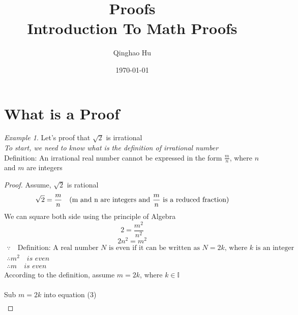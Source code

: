 \documentclass[12pt]{article}
\title{\textbf{Proofs} \\ \large Introduction To Math Proofs}
\author{Qinghao Hu}
\date{\today}
\theoremstyle{remark}
\newtheorem*{example}{Example}
\begin{document}
\maketitle
\newpage
\tableofcontents
\newpage

\section{What is a Proof}
\begin{example}
	Let's proof that $\sqrt{2}$ is irrational\\
	\indent\textit{To start, we need to know what is the definition of irrational number} \\
	\indent Definition: An irrational real number cannot be expressed in the form $\frac{m}{n}$, where $n$ and $m$ are integers \\
	\begin{proof}
		Assume, $\sqrt{2}$ is rational \\
		\begin{equation}
			\sqrt{2} = {m \over n} \quad \text{(m and n are integers and $\frac{m}{n}$ is a reduced fraction)}
		\end{equation}
		We can square both side using the principle of Algebra \\
		\begin{equation}
			2 = \frac{m^2}{n^2} 
		\end{equation}
		\begin{equation}
			2n^2 = m^2
		\end{equation}
		\begin{gather}
		\because \quad \text{Definition: A real number $N$ is even if it can be written as $N = 2k$, where $k$ is an integer}\\
		\therefore m^2 \quad\textit{is even} \\
		\therefore m \quad\textit{is even}
		\end{gather}
		According to the definition, assume $m = 2k$, where $k \in \mathbb{I}$ \\
		\\
		Sub $m = 2k$ into equation (3)
		\begin{gather}

\end{gather}
\end{proof}
\end{example}
\end{document}
